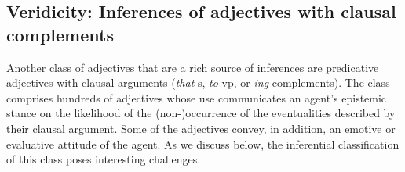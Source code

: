 \documentclass[10pt]{article}
\begin{document}
%
%


\subsection{Veridicity: Inferences of adjectives with clausal complements}
Another class of adjectives that are a rich source of inferences are predicative adjectives with clausal arguments (\emph{that} {\sc s}, \emph{to} {\sc vp}, or \emph{ing} complements). The class comprises hundreds of adjectives whose use communicates an agent's epistemic stance on the likelihood of the (non-)occurrence of the eventualities described by their clausal argument. Some of the adjectives convey, in addition, an emotive or evaluative attitude of the agent. As we discuss below, the inferential classification of this class poses interesting challenges.
\end{document}
